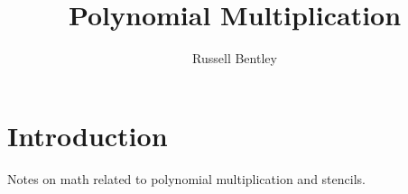 \documentclass{article}
\title{Polynomial Multiplication}
\author{Russell Bentley}
\begin{document}
\twocolumn

\maketitle

\tableofcontents

\section{Introduction}

Notes on math related to polynomial multiplication and stencils.




\printbibliography
\end{document}
